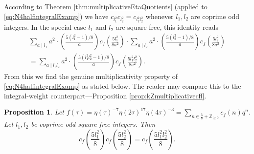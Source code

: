 \documentclass[12pt]{amsart}
\numberwithin{equation}{section}
\theoremstyle{plain}
\newtheorem{prop}[thm]{Proposition}
\theoremstyle{definition}
\theoremstyle{remark}
\newcommand\legendre[2]{\genfrac{(}{)}{}{}{#1}{#2}}
\newcommand\numgeq[2]{\mathbb{#1}_{\geq #2}}
\begin{document}
According to Theorem \ref{thm:multiplicativeEtaQuotients} (applied to \eqref{eq:N4halfintegralExamp}) we have $c_{l_1^2}c_{l_2^2}=c_{l_1^2l_2^2}$ whenever $l_1,l_2$ are coprime odd integers. In the special case $l_1$ and $l_2$ are square-free, this identity reads
\begin{multline}
\label{eq:N4ExampMultisf}
\sum_{a\mid l_1}a^2\cdot\legendre{5(l_1^2-1)/8}{a}c_f\left(\frac{5l_1^2}{8a^2}\right)\cdot\sum_{a\mid l_2}a^2\cdot\legendre{5(l_2^2-1)/8}{a}c_f\left(\frac{5l_2^2}{8a^2}\right)\\
=\sum_{a\mid l_1l_2}a^2\cdot\legendre{5(l_1^2l_2^2-1)/8}{a}c_f\left(\frac{5l_1^2l_2^2}{8a^2}\right).
\end{multline}
From this we find the genuine multiplicativity property of \eqref{eq:N4halfintegralExamp} as stated below. The reader may compare this to the integral-weight counterpart---Proposition \ref{prop:kZmultiplicativecfl}.
\begin{prop}
\label{prop:semiMultiExampLevel4}
Let $f(\tau)=\eta(\tau)^{-7}\eta(2\tau)^{17}\eta(4\tau)^{-3}=\sum_{n\in\frac{5}{8}+\numgeq{Z}{0}}c_f(n)q^n$. Let $l_1,l_2$ be coprime odd square-free integers. Then
\begin{equation*}
c_f\left(\frac{5l_1^2}{8}\right)c_f\left(\frac{5l_2^2}{8}\right)=c_f\left(\frac{5l_1^2l_2^2}{8}\right).
\end{equation*}
\end{prop}
\end{document}
